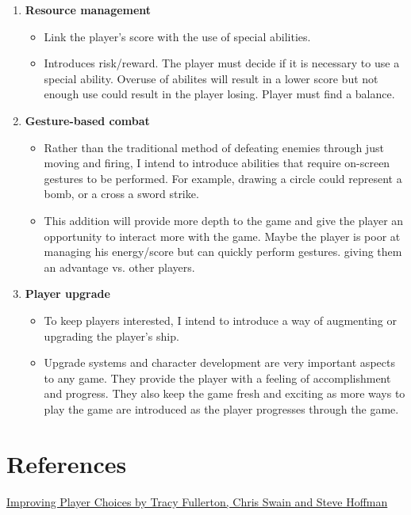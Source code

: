 \documentclass[a4paper]{scrreprt}
\begin{document}
\begin{enumerate}
  \item \textbf{Resource management}
  \begin{itemize}
    \item Link the player's score with the use of special abilities.
    \item Introduces risk/reward. The player must decide if it is necessary to use a special ability. Overuse of abilites will result in a lower score but not enough use could result in the player losing. Player must find a balance.
  \end{itemize}
  \item \textbf{Gesture-based combat}
  \begin{itemize}
    \item Rather than the traditional method of defeating enemies through just moving and firing, I intend to introduce abilities that require on-screen gestures to be performed. For example, drawing a circle could represent a bomb, or a cross a sword strike.
    \item This addition will provide more depth to the game and give the player an opportunity to interact more with the game. Maybe the player is poor at managing his energy/score but can quickly perform gestures. giving them an advantage vs. other players.
  \end{itemize}
  \item \textbf{Player upgrade}
  \begin{itemize}
    \item To keep players interested, I intend to introduce a way of augmenting or upgrading the player's ship.
    \item Upgrade systems and character development are very important aspects to any game. They provide the player with a feeling of accomplishment and progress. They also keep the game fresh and exciting as more ways to play the game are introduced as the player progresses through the game.
  \end{itemize}

\end{enumerate}


\chapter{References} 
\href{https://www.gamasutra.com/view/feature/130452/improving_player_choices.php}{Improving Player Choices by Tracy Fullerton, Chris Swain and Steve Hoffman}
\end{document}
